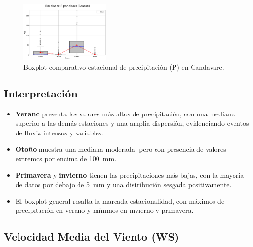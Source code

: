 \vspace{0.2cm}

\begin{figure}[H]
\centering
\includegraphics[width=0.4\textwidth]{resultados/por_estacion_del_anio/boxplot_clases_por_estacion/Candavare/P_ClassBoxplot_Season.png}
\caption{Boxplot comparativo estacional de precipitación (P) en Candavare.}
\label{fig:candavare_p_box}
\end{figure}

\subsection*{Interpretación}

\begin{itemize}
    \item \textbf{Verano} presenta los valores más altos de precipitación, con una mediana superior a las demás estaciones y una amplia dispersión, evidenciando eventos de lluvia intensos y variables.
    \item \textbf{Otoño} muestra una mediana moderada, pero con presencia de valores extremos por encima de 100~mm.
    \item \textbf{Primavera} y \textbf{invierno} tienen las precipitaciones más bajas, con la mayoría de datos por debajo de 5~mm y una distribución sesgada positivamente.
    \item El boxplot general resalta la marcada estacionalidad, con máximos de precipitación en verano y mínimos en invierno y primavera.
\end{itemize}

\subsection{Velocidad Media del Viento (WS)}

